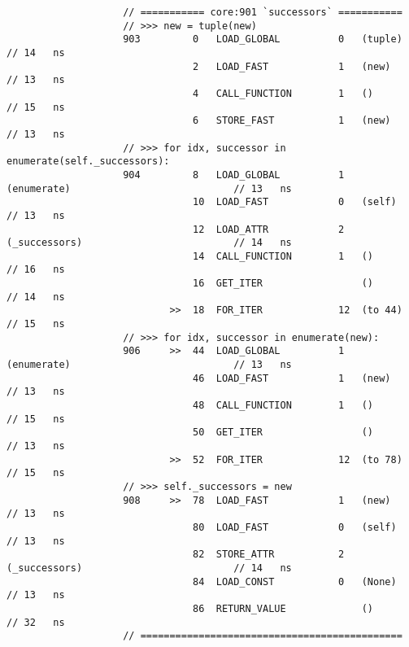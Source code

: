 \begin{code}
\begin{verbatim}
                    // =========== core:901 `successors` ===========
                    // >>> new = tuple(new)
                    903         0   LOAD_GLOBAL          0   (tuple)                                // 14   ns
                                2   LOAD_FAST            1   (new)                                  // 13   ns
                                4   CALL_FUNCTION        1   ()                                     // 15   ns
                                6   STORE_FAST           1   (new)                                  // 13   ns
                    // >>> for idx, successor in enumerate(self._successors):
                    904         8   LOAD_GLOBAL          1   (enumerate)                            // 13   ns
                                10  LOAD_FAST            0   (self)                                 // 13   ns
                                12  LOAD_ATTR            2   (_successors)                          // 14   ns
                                14  CALL_FUNCTION        1   ()                                     // 16   ns
                                16  GET_ITER                 ()                                     // 14   ns
                            >>  18  FOR_ITER             12  (to 44)                                // 15   ns
                    // >>> for idx, successor in enumerate(new):
                    906     >>  44  LOAD_GLOBAL          1   (enumerate)                            // 13   ns
                                46  LOAD_FAST            1   (new)                                  // 13   ns
                                48  CALL_FUNCTION        1   ()                                     // 15   ns
                                50  GET_ITER                 ()                                     // 13   ns
                            >>  52  FOR_ITER             12  (to 78)                                // 15   ns
                    // >>> self._successors = new
                    908     >>  78  LOAD_FAST            1   (new)                                  // 13   ns
                                80  LOAD_FAST            0   (self)                                 // 13   ns
                                82  STORE_ATTR           2   (_successors)                          // 14   ns
                                84  LOAD_CONST           0   (None)                                 // 13   ns
                                86  RETURN_VALUE             ()                                     // 32   ns
                    // =============================================


\end{verbatim}
\end{code}
